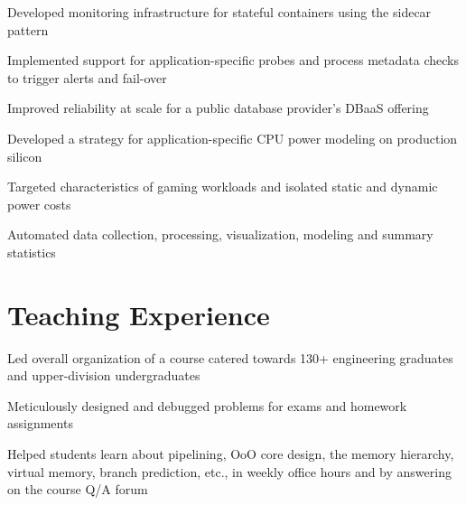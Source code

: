 \documentclass[]{deedy-resume-openfont}
\begin{document}
\vspace{\topsep}
\vspace{\topsep} %
{\normalsize
\begin{tightemize}
\item Developed monitoring infrastructure for stateful containers using the sidecar pattern
\item Implemented support for application-specific probes and process metadata checks to trigger alerts and fail-over
\item Improved reliability at scale for a public database provider's DBaaS offering
\end{tightemize}
}

\vspace{\topsep}
\vspace{\topsep} %
{\normalsize
\begin{tightemize}
\item Developed a strategy for application-specific CPU power modeling on production silicon
\item Targeted characteristics of gaming workloads and isolated static and dynamic power costs
\item Automated data collection, processing, visualization, modeling and summary statistics
\end{tightemize}
}
\sectionsep


\section{Teaching Experience}

\vspace{\topsep} %
\begin{tightemize}
\item Led overall organization of a course catered towards 130+ engineering graduates and upper-division undergraduates
\item Meticulously designed and debugged problems for exams and homework assignments
\item Helped students learn about pipelining, OoO core design, the memory hierarchy, virtual memory, branch prediction, etc., in weekly office hours and by answering on the course Q/A forum
\end{tightemize}
\sectionsep
\end{document}
